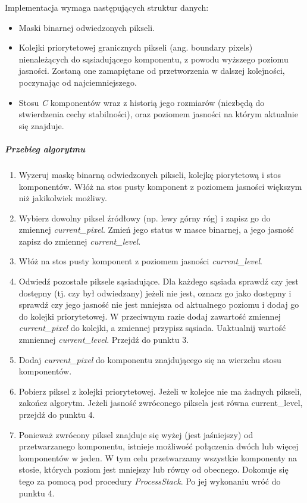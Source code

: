 Implementacja wymaga następujących struktur danych: 
\begin{itemize} \item Maski binarnej odwiedzonych pikseli.  \item Kolejki
    priorytetowej granicznych pikseli (ang. boundary pixels) nienależących do
    sąsiadującego komponentu, z powodu wyższego poziomu jasności. Zostaną one
    zamapiętane od przetworzenia w dalszej kolejności, poczynając od
    najciemniejszego.  \item Stosu \textit{C} komponentów wraz z historią jego
    rozmiarów (niezbędą do stwierdzenia cechy stabilności), oraz poziomem
    jasności na którym aktualnie się znajduje.  \end{itemize}

\subparagraph{Przebieg algorytmu}

\begin{enumerate} \item Wyzeruj maskę binarną odwiedzonych pikseli, kolejkę
piorytetową i stos komponentów. Włóż na stos pusty komponent z poziomem
jasności większym niż jakikolwiek możliwy. \item Wybierz dowolny piksel
źródłowy (np. lewy górny róg) i zapisz go do zmiennej \textit{current\_pixel}.
Zmień jego status w masce binarnej, a jego jasność zapisz do zmiennej
\textit{current\_level}. \item Włóż na stos pusty komponent z poziomem jasności
\textit{current\_level}. \item Odwiedź pozostałe piksele sąsiadujące. Dla
każdego sąsiada sprawdź czy jest dostępny (tj. czy był odwiedzany) jeżeli nie
jest, oznacz go jako dostępny i sprawdź czy jego jasność nie jest mniejsza od
aktualnego poziomu i dodaj go do kolejki priorytetowej. W przeciwnym razie
dodaj zawartość zmiennej \textit{current\_pixel} do kolejki, a zmiennej
przypisz sąsiada. Uaktualnij wartość zmniennej \textit{current\_level}. Przejdź
do punktu 3. \item Dodaj \textit{current\_pixel} do komponentu znajdującego się
na wierzchu stosu komponentów. \item Pobierz piksel z kolejki priorytetowej.
Jeżeli w kolejce nie ma żadnych pikseli, zakończ algorytm. Jeżeli jasność
zwróconego piksela jest równa current\_level, przejdź do punktu 4. \item
Ponieważ zwrócony piksel znajduje się wyżej (jest jaśniejszy) od
przetwarzanego komponentu, istnieje możliwość połączenia dwóch lub więcej
komponentów w jeden. W tym celu przetwarzamy wszystkie komponenty na stosie,
których poziom jest mniejszy lub równy od obecnego. Dokonuje się tego za pomocą
pod procedury \textit{ProcessStack}. Po jej wykonaniu wróć do punktu 4. \end{enumerate}

